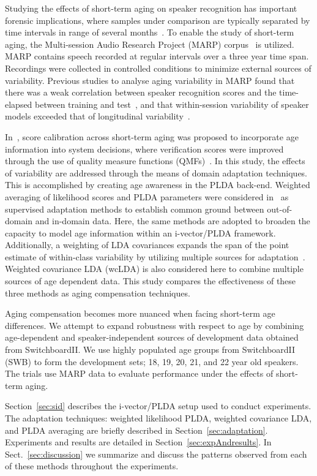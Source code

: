 \documentclass[a4paper]{article}
\begin{document}
Studying the effects of short-term aging on speaker recognition has important forensic implications, where samples under comparison are typically separated by time intervals in range of several months~\cite{paper7}. To enable the study of short-term aging, the Multi-session Audio Research Project (MARP) corpus~\cite{paper12} is utilized. MARP contains speech recorded at regular intervals over a three year time span. Recordings were collected in controlled conditions to minimize external sources of variability. Previous studies to analyse aging variability in MARP found that there was a weak correlation between speaker recognition scores and the time-elapsed between training and test~\cite{paper13}, and that within-session variability of speaker models exceeded that of longitudinal variability~\cite{paper14}.

In~\cite{kellyinterspeech15}, score calibration across short-term aging was proposed to incorporate age information into system decisions, where verification scores were improved through the use of quality measure functions (QMFs)~\cite{paper18}. In this study, the effects of variability are addressed through the means of domain adaptation techniques. This is accomplished by creating age awareness in the PLDA back-end. Weighted averaging of likelihood scores and PLDA parameters were considered in~\cite{garcia2014supervised} as supervised adaptation methods to establish common ground between out-of-domain and in-domain data. Here, the same methods are adopted to broaden the capacity to model age information within an i-vector/PLDA framework. Additionally, a weighting of LDA covariances expands the span of the point estimate of within-class variability by utilizing multiple sources for adaptation~\cite{weightedLDA}. Weighted covariance LDA (wcLDA) is also considered here to combine multiple sources of age dependent data. This study compares the effectiveness of these three methods as aging compensation techniques.  

Aging compensation becomes more nuanced when facing short-term age differences. We attempt to expand robustness with respect to age by combining age-dependent and speaker-independent sources of development data obtained from SwitchboardII. We use highly populated  age groups from SwitchboardII (SWB) to form the development sets; 18, 19, 20, 21, and 22 year old speakers. The trials use MARP data to evaluate performance under the effects of short-term aging.  

Section~\ref{sec:sid} describes the i-vector/PLDA setup used to conduct experiments. The adaptation techniques: weighted likelihood PLDA, weighted covariance LDA, and PLDA averaging are briefly described in Section~\ref{sec:adaptation}. Experiments and results are detailed in Section~\ref{sec:expAndresults}. In Sect.~\ref{sec:discussion} we summarize and discuss the patterns observed from each of these methods throughout the experiments.
\end{document}
